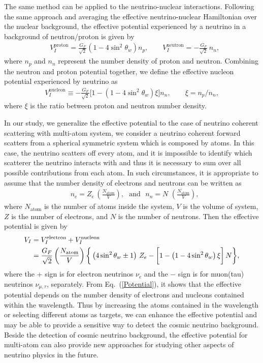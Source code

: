The same method can be applied to the neutrino-nuclear interactions. Following the same approach and averaging the effective neutrino-nuclear Hamiltonian over the nuclear background, the effective potential experienced by a neutrino in a background of neutron/proton is given by~\cite{Giunti:2007ry} 
\begin{align}
&V_{I}^{\mathrm{proton}}=\frac{G_F}{\sqrt{2}}\left(1-4\sin^2\theta_w\right)n_{p},\qquad V_{I}^{\mathrm{neutron}}=-\frac{G_F}{\sqrt{2}}\,n_{n},
\end{align}
where $n_p$ and $n_n$ represent the number density of proton and neutron.
Combining the neutron and proton potential together, we define the effective nucleon potential experienced by neutrino as 
\begin{align}
V_I^{\mathrm{nucleon}}\equiv-\frac{G_F}{\sqrt{2}}\bigg[1-\left(1-4\sin^2\theta_w\right)\xi\bigg]n_{n},\qquad\xi=n_{p}/n_{n},
\end{align}
where $\xi$ is the ratio between proton and neutron number density.

In our study, we generalize the effective potential to the case of neutrino coherent scattering with multi-atom system, we consider a neutrino coherent forward scatters from a spherical symmetric system which is composed by atoms. In this case, the neutrino scatters off every atom, and it is impossible to identify which scatterer the neutrino interacts with and thus it is necessary to sum over all possible contributions from each atom. In such circumstances, it is appropriate to assume that the number density of electrons and neutrons can be written as
\begin{align}
&n_e=Z_e\,\left(\frac{N_\mathrm{atom}}{V}\right),\,\,\,\,\mathrm{and}\,\,\,\,n_n=N\,\,\left(\frac{N_\mathrm{atom}}{V}\right),
\end{align}
where $N_\mathrm{atom}$ is the number of atoms inside the system, $V$ is the volume of system, $Z$ is the number of electrons, and $N$ is the number of neutrons.
Then the effective potential is given by
\begin{align}
\label{Potential}
V_{I}&=V_I^{\mathrm{electron}}+V_I^{\mathrm{nucleon}}\notag\\&=\frac{G_F}{\sqrt{2}}\left(\frac{N_\mathrm{atom}}{V}\right)\bigg\{\left(4\sin^2\theta_w\pm1\right)\,Z_e-\bigg[1-\left(1-4\sin^2\theta_w\right)\xi\bigg]\,N\bigg\},
\end{align}
where the $+$ sign is for electron neutrinos $\nu_e$ and the $-$ sign is for muon(tau) neutrinos $\nu_{\mu,\tau}$, separately. 
From Eq.~(\ref{Potential}), it shows that the effective potential depends on the number density of electrons and nucleons contained within the wavelength. 
Thus by increasing the  atoms contained in the wavelength or selecting different atoms as targets, we can enhance the effective potential and may be able to provide a sensitive way to detect the cosmic neutrino background. Beside the detection of cosmic neutrino background, the effective potential for multi-atom can also provide new approaches for studying other aspects of neutrino physics in the future.

